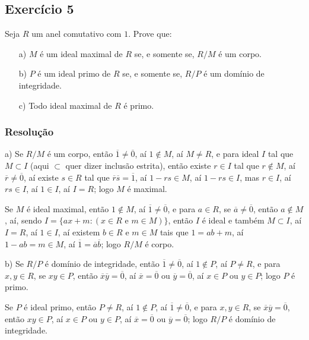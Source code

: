 \documentclass[10pt,a4paper]{article}
\begin{document}
\subsection*{Exercício 5}

Seja $R$ um anel comutativo com $1$. Prove que:
\begin{itemize}
\item[a)] $M$ é um ideal maximal de $R$ se, e somente se, $R/M$ é um corpo.
\item[b)] $P$ é um ideal primo de $R$ se, e somente se, $R/P$ é um domínio de integridade.
\item[c)] Todo ideal maximal de $R$ é primo.
\end{itemize}

\subsubsection*{Resolução}

a) Se $R/M$ é um corpo, então $\overline{1}\neq\overline{0}$, aí $1\notin M$, aí $M\neq R$, e para ideal $I$ tal que $M\subset I$ (aqui $\subset$ quer dizer inclusão estrita), então existe $r\in I$ tal que $r\notin M$, aí $\overline{r}\neq\overline{0}$, aí existe $s\in R$ tal que $\overline{r}\overline{s}=\overline{1}$, aí $1-rs\in M$, aí $1-rs\in I$, mas $r\in I$, aí $rs\in I$, aí $1\in I$, aí $I=R$; logo $M$ é maximal.

\medskip
\noindent
Se $M$ é ideal maximal, então $1\notin M$, aí $\overline{1}\neq\overline{0}$, e para $a\in R$, se $\overline{a}\neq\overline{0}$, então $a\notin M$, aí, sendo $I=\{ax+m:(x\in R\text{ e }m\in M)\}$, então $I$ é ideal e também $M\subset I$, aí $I=R$, aí $1\in I$, aí existem $b\in R$ e $m\in M$ tais que $1=ab+m$, aí $1-ab=m\in M$, aí $\overline{1}=\overline{a}\overline{b}$; logo $R/M$ é corpo.

\medskip
\noindent
b) Se $R/P$ é domínio de integridade, então $\overline{1}\neq\overline{0}$, aí $1\notin P$, aí $P\neq R$, e para $x,y\in R$, se $xy\in P$, então $\overline{x}\overline{y}=\overline{0}$, aí $\overline{x}=\overline{0}$ ou $\overline{y}=\overline{0}$, aí $x\in P$ ou $y\in P$; logo $P$ é primo.

\medskip
\noindent
Se $P$ é ideal primo, então $P\neq R$, aí $1\notin P$, aí $\overline{1}\neq\overline{0}$, e para $x,y\in R$, se $\overline{x}\overline{y}=\overline{0}$, então $xy\in P$, aí $x\in P$ ou $y\in P$, aí $\overline{x}=\overline{0}$ ou $\overline{y}=\overline{0}$; logo $R/P$ é domínio de integridade.
\end{document}
